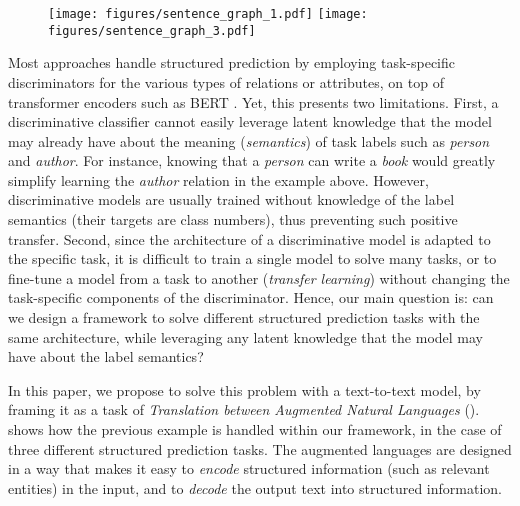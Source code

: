 \begin{figure}[h]
\begin{center}
    \texttt{[image: figures/sentence\_graph\_1.pdf]}
    \hspace{.5cm}
    \texttt{[image: figures/sentence\_graph\_3.pdf]}
\end{center}
\vspace{-0.2cm}
\end{figure}

Most approaches handle structured prediction by employing task-specific discriminators for the various types of relations or attributes, on top of \pretrained transformer encoders such as BERT \citep{bert}.
Yet, this presents two limitations.
First, a discriminative classifier cannot easily leverage latent knowledge that the \pretrained model may already have about the meaning (\emph{semantics}) of task labels such as \emph{person} and \emph{author}.
For instance, knowing that a \emph{person} can write a \emph{book} would greatly simplify learning the \emph{author} relation in the example above.
However, discriminative models are usually trained without knowledge of the label semantics (their targets are class numbers), thus preventing such positive transfer.
Second, since the architecture of a discriminative model is adapted to the specific task, it is difficult to train a single model to solve many tasks, or to fine-tune a model from a task to another (\emph{transfer learning}) without changing the task-specific components of the discriminator.
Hence, our main question is: can we design a framework to solve different structured prediction tasks with the same architecture, while leveraging any latent knowledge that the \pretrained model may have about the label semantics?

In this paper, we propose to solve this problem with a text-to-text model, by framing it as a task of \emph{Translation between Augmented Natural Languages} (\ourmodel).
 shows how the previous example is handled within our framework, in the case of three different structured prediction tasks.
The augmented languages are designed in a way that makes it easy to \emph{encode} structured information (such as relevant entities) in the input, and to \emph{decode} the output text into structured information.

